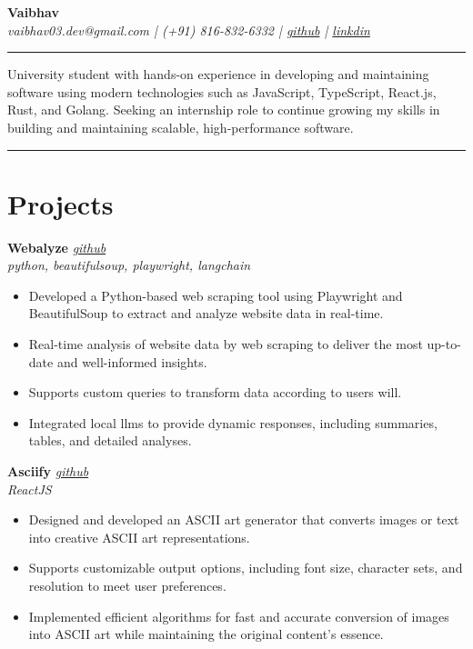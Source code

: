 \documentclass[a4paper,10pt]{article}
\begin{document}
\begin{center}
    {\LARGE \textbf{Vaibhav}} \\
    \vspace{3pt}
    \textit{vaibhav03.dev@gmail.com | (+91) 816-832-6332 | \href{http://github.com/quantinium03}{github} | \href{https://www.linkedin.com/in/vaibhav-chauhan-1781051a1/}{linkdin}}
\end{center}

\vspace{3pt}
\hrule

\vspace{1pt}
University student with hands-on experience in developing and maintaining software using modern technologies such as JavaScript, TypeScript, React.js, Rust, and Golang. Seeking an internship role to continue growing my skills in building and maintaining scalable, high-performance software.
\vspace{5pt}

\hrule
\vspace{5pt}

\section*{Projects}
\textbf{Webalyze} \hfill \textit{\href{http://github.com/quantinium03/webalyze}{github}} \\
\textit{python, beautifulsoup, playwright, langchain} \\
\vspace{-15pt}
\begin{itemize}[itemsep=0pt, parsep=0pt]
    \item Developed a Python-based web scraping tool using Playwright and BeautifulSoup to extract and analyze website data in real-time.
    \item Real-time analysis of website data by web scraping to deliver the most up-to-date and well-informed insights.
    \item Supports custom queries to transform data according to users will.
    \item Integrated local llms to provide dynamic responses, including summaries, tables, and detailed analyses.
\end{itemize}

\textbf{Asciify} \hfill \textit{\href{http://github.com/quantinium03/asami}{github}} \\
\textit{ReactJS} \\
\vspace{-15pt}
\begin{itemize}[itemsep=0pt, parsep=0pt]
    \item Designed and developed an ASCII art generator that converts images or text into creative ASCII art representations.  
    \item Supports customizable output options, including font size, character sets, and resolution to meet user preferences.  
    \item Implemented efficient algorithms for fast and accurate conversion of images into ASCII art while maintaining the original content's essence.  
\end{itemize}
\end{document}
